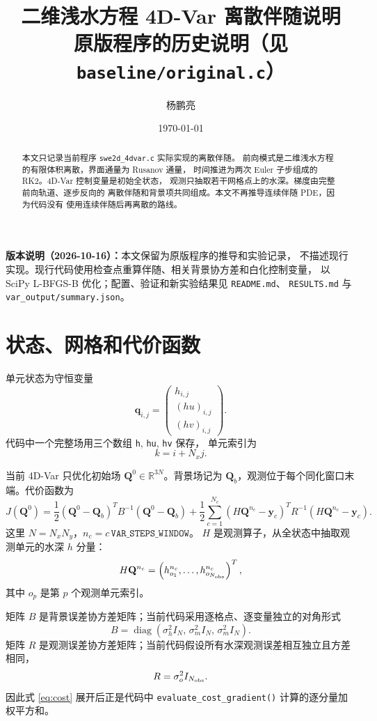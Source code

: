 \documentclass[12pt,a4paper]{article}
\title{二维浅水方程 4D-Var 离散伴随说明\\
\large 原版程序的历史说明（见 \texttt{baseline/original.c}）}
\author{杨鹏亮}
\date{\today}
\begin{document}
\maketitle

\noindent\textbf{版本说明（2026-10-16）：}本文保留为原版程序的推导和实验记录，
不描述现行实现。现行代码使用检查点重算伴随、相关背景协方差和白化控制变量，
以 SciPy L-BFGS-B 优化；配置、验证和新实验结果见 \texttt{README.md}、
\texttt{RESULTS.md} 与 \texttt{var\_output/summary.json}。


\begin{abstract}
本文只记录当前程序 \texttt{swe2d\_4dvar.c} 实际实现的离散伴随。
前向模式是二维浅水方程的有限体积离散，界面通量为 Rusanov 通量，
时间推进为两次 Euler 子步组成的 RK2。4D-Var 控制变量是初始全状态，
观测只抽取若干网格点上的水深。梯度由完整前向轨道、逐步反向的
离散伴随和背景项共同组成。本文不再推导连续伴随 PDE，因为代码没有
使用连续伴随后再离散的路线。
\end{abstract}

\tableofcontents

\section{状态、网格和代价函数}

单元状态为守恒变量
\[
\mathbf{q}_{i,j} =
\begin{pmatrix}
h_{i,j}\\
(hu)_{i,j}\\
(hv)_{i,j}
\end{pmatrix}.
\]
代码中一个完整场用三个数组 \texttt{h}, \texttt{hu}, \texttt{hv} 保存，
单元索引为
\[
k=i+N_x j.
\]

当前 4D-Var 只优化初始场 $\mathbf{Q}^0\in\mathbb{R}^{3N}$。背景场记为
$\mathbf{Q}_b$，观测位于每个同化窗口末端。代价函数为
\begin{equation}
J(\mathbf{Q}^0)
=
\frac12(\mathbf{Q}^0-\mathbf{Q}_b)^T B^{-1}(\mathbf{Q}^0-\mathbf{Q}_b)
+\frac12\sum_{c=1}^{N_c}
\left(H\mathbf{Q}^{n_c}-\mathbf{y}_c\right)^T
R^{-1}
\left(H\mathbf{Q}^{n_c}-\mathbf{y}_c\right).
\label{eq:cost}
\end{equation}
这里 $N=N_xN_y$，$n_c=c\,\mathtt{VAR\_STEPS\_WINDOW}$。
$H$ 是观测算子，从全状态中抽取观测单元的水深 $h$ 分量：
\[
H\mathbf{Q}^{n_c}
=
\left(h_{o_1}^{n_c},\ldots,h_{o_{N_{\rm obs}}}^{n_c}\right)^T,
\]
其中 $o_p$ 是第 $p$ 个观测单元索引。

矩阵 $B$ 是背景误差协方差矩阵；当前代码采用逐格点、逐变量独立的对角形式
\[
B=\operatorname{diag}\left(
\sigma_h^2 I_N,\,
\sigma_m^2 I_N,\,
\sigma_m^2 I_N
\right).
\]
矩阵 $R$ 是观测误差协方差矩阵；当前代码假设所有水深观测误差相互独立且方差相同，
\[
R=\sigma_o^2 I_{N_{\rm obs}}.
\]
因此式 \eqref{eq:cost} 展开后正是代码中
\texttt{evaluate\_cost\_gradient()} 计算的逐分量加权平方和。
\end{document}
